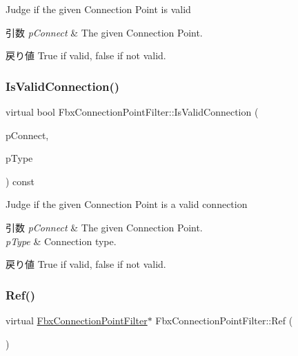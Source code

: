 Judge if the given Connection Point is valid 
\begin{DoxyParams}{引数}
{\em p\+Connect} & The given Connection Point. \\
\hline
\end{DoxyParams}
\begin{DoxyReturn}{戻り値}
{\ttfamily True} if valid, {\ttfamily false} if not valid. 
\end{DoxyReturn}
\mbox{\label{class_fbx_connection_point_filter_a5107fd1fd412e96043f294a78bd3cf84}} 
\subsubsection{\texorpdfstring{Is\+Valid\+Connection()}{IsValidConnection()}}
{\footnotesize\ttfamily virtual bool Fbx\+Connection\+Point\+Filter\+::\+Is\+Valid\+Connection (\begin{DoxyParamCaption}\item[{\hyperlink{class_fbx_connection_point}{Fbx\+Connection\+Point} $\ast$}]{p\+Connect,  }\item[{\hyperlink{class_fbx_connection_a3df448a5db356652ab99fd2be2553749}{Fbx\+Connection\+::\+E\+Type}}]{p\+Type }\end{DoxyParamCaption}) const\hspace{0.3cm}{\ttfamily [virtual]}}

Judge if the given Connection Point is a valid connection 
\begin{DoxyParams}{引数}
{\em p\+Connect} & The given Connection Point. \\
\hline
{\em p\+Type} & Connection type. \\
\hline
\end{DoxyParams}
\begin{DoxyReturn}{戻り値}
{\ttfamily True} if valid, {\ttfamily false} if not valid. 
\end{DoxyReturn}
\mbox{\label{class_fbx_connection_point_filter_a45f2c3742d96bcac9a03b4971242fa79}} 
\subsubsection{\texorpdfstring{Ref()}{Ref()}}
{\footnotesize\ttfamily virtual \hyperlink{class_fbx_connection_point_filter}{Fbx\+Connection\+Point\+Filter}$\ast$ Fbx\+Connection\+Point\+Filter\+::\+Ref (\begin{DoxyParamCaption}{ }\end{DoxyParamCaption})\hspace{0.3cm}{\ttfamily [virtual]}}




